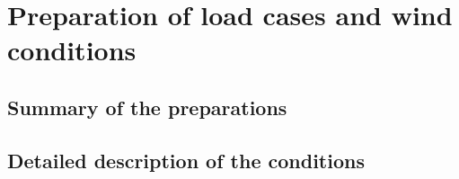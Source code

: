 \section{Preparation of load cases and wind conditions}

\subsection{Summary of the preparations}
\subsection{Detailed description of the conditions}